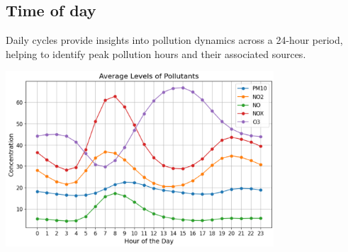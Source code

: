 \documentclass{modeleRapport}
\begin{document}
\subsection{Time of day}

Daily cycles provide insights into pollution dynamics across a 24-hour period, helping to identify peak pollution hours 
and their associated sources.\\

\begin{center}
    \includegraphics[width=10cm]{Images/PollutantsPerDay.png}
\end{center}
\end{document}
